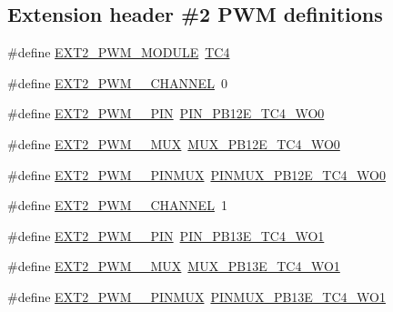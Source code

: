 \subsection*{Extension header \#2 P\+WM definitions}
\begin{DoxyCompactItemize}
\item 
\#define \mbox{\hyperlink{group__samd21__xplained__pro__features__group_ga4065afb7edcb95b1119a9e48d6891326}{E\+X\+T2\+\_\+\+P\+W\+M\+\_\+\+M\+O\+D\+U\+LE}}~\mbox{\hyperlink{group___s_a_m_d21_j18_a__base_ga877f51fe7311fbc9c49c966ba738be05}{T\+C4}}
\item 
\#define \mbox{\hyperlink{group__samd21__xplained__pro__features__group_ga6d520cd848a0df7fe5b1cfa44c3a77ac}{E\+X\+T2\+\_\+\+P\+W\+M\+\_\+\_\+\+C\+H\+A\+N\+N\+EL}}~0
\item 
\#define \mbox{\hyperlink{group__samd21__xplained__pro__features__group_gab1bc229e3900ec14f5e718a435567549}{E\+X\+T2\+\_\+\+P\+W\+M\+\_\+\_\+\+P\+IN}}~\mbox{\hyperlink{pio_2samd21j18a_8h_ab6b809fa2a40673cd40cbbc7bd930a9d}{P\+I\+N\+\_\+\+P\+B12\+E\+\_\+\+T\+C4\+\_\+\+W\+O0}}
\item 
\#define \mbox{\hyperlink{group__samd21__xplained__pro__features__group_gaf3d83c1098af352df8b4411102d0defa}{E\+X\+T2\+\_\+\+P\+W\+M\+\_\+\_\+\+M\+UX}}~\mbox{\hyperlink{pio_2samd21j18a_8h_ab9c85ac354f387eb40aaec5c121b653b}{M\+U\+X\+\_\+\+P\+B12\+E\+\_\+\+T\+C4\+\_\+\+W\+O0}}
\item 
\#define \mbox{\hyperlink{group__samd21__xplained__pro__features__group_gab651a3d9a5cc47de89da5390125b60ef}{E\+X\+T2\+\_\+\+P\+W\+M\+\_\+\_\+\+P\+I\+N\+M\+UX}}~\mbox{\hyperlink{pio_2samd21j18a_8h_ad3787c9572bd467c9a9ff56659c03dc2}{P\+I\+N\+M\+U\+X\+\_\+\+P\+B12\+E\+\_\+\+T\+C4\+\_\+\+W\+O0}}
\item 
\#define \mbox{\hyperlink{group__samd21__xplained__pro__features__group_ga8230fa68feeedc7a491be3d10c7d6bce}{E\+X\+T2\+\_\+\+P\+W\+M\+\_\+\_\+\+C\+H\+A\+N\+N\+EL}}~1
\item 
\#define \mbox{\hyperlink{group__samd21__xplained__pro__features__group_ga641bd7ece0fdf2a8cfd49c75ed8f93bc}{E\+X\+T2\+\_\+\+P\+W\+M\+\_\+\_\+\+P\+IN}}~\mbox{\hyperlink{pio_2samd21j18a_8h_ab17c34e5d668dc3db35fdfe4ec67c91d}{P\+I\+N\+\_\+\+P\+B13\+E\+\_\+\+T\+C4\+\_\+\+W\+O1}}
\item 
\#define \mbox{\hyperlink{group__samd21__xplained__pro__features__group_ga159afe58057253f3b8fddd70f6101dc8}{E\+X\+T2\+\_\+\+P\+W\+M\+\_\+\_\+\+M\+UX}}~\mbox{\hyperlink{pio_2samd21j18a_8h_a1596bf26e7e5238979faa58bb9901666}{M\+U\+X\+\_\+\+P\+B13\+E\+\_\+\+T\+C4\+\_\+\+W\+O1}}
\item 
\#define \mbox{\hyperlink{group__samd21__xplained__pro__features__group_gaac9afe6017edd312bcfa50f6f61cc9dc}{E\+X\+T2\+\_\+\+P\+W\+M\+\_\+\_\+\+P\+I\+N\+M\+UX}}~\mbox{\hyperlink{pio_2samd21j18a_8h_a33418c45a490b4dcbd62ed165c4e96ff}{P\+I\+N\+M\+U\+X\+\_\+\+P\+B13\+E\+\_\+\+T\+C4\+\_\+\+W\+O1}}
\end{DoxyCompactItemize}
